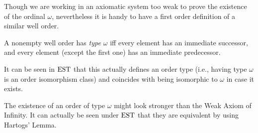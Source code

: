 Though we are working in an axiomatic system too weak to prove the existence of
the ordinal $\omega$, nevertheless it is handy to have a first order definition
of a similar well order.
\begin{definition}
  A nonempty well order has \emph{type $\omega$} iff  every element
  has an immediate successor, and every element (except the first one) has an
  immediate predecessor.
\end{definition}
It can be seen in $\mathrm{EST}$ that this actually defines an order type (i.e.,
having type $\omega$ is an order isomorphism class) and coincides with being
isomorphic to $\omega$ in case it exists.

The existence of an order of type $\omega$ might look stronger than the Weak
Axiom of Infinity. It can actually be seen under $\mathrm{EST}$ that they are equivalent
by using Hartogs' Lemma.

